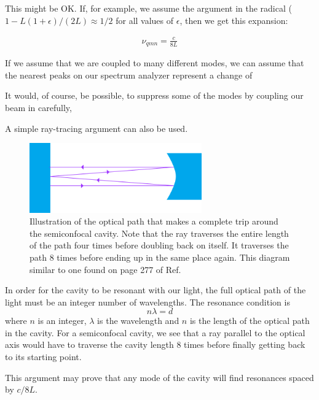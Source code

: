 This might be OK. If, for example, we assume the argument in the radical ($1-L(1+\epsilon)/(2L)\approx 1/2$ for all values of $\epsilon$, then we get this expansion: 

\begin{align}
\nu_{qmn}=\frac{c}{8L}
\end{align}



If we assume that we are coupled to many different modes, we can assume that the nearest peaks on our spectrum analyzer represent a change of 

It would, of course, be possible, to suppress some of the modes by coupling our beam in carefully, 

A simple ray-tracing argument can also be used. 
\begin{figure}
\centerline{\includegraphics[height=3cm]{spectrum_analyzer_path.png}}
\caption{Illustration of the optical path that makes a complete trip around the semiconfocal cavity. Note that the ray traverses the entire length of the path four times before doubling back on itself. It traverses the path 8 times before ending up in the same place again. This diagram similar to one found on page 277 of Ref.\ \cite{lasersMilonniEberly}}
\end{figure}

In order for the cavity to be resonant with our light, the full optical path of the light must be an integer number of wavelengths. The resonance condition is 
\begin{equation}
n \lambda = d
\end{equation}
where $n$ is an integer, $\lambda$ is the wavelength and $n$ is the length of the optical path in the cavity. 
For a semiconfocal cavity, we see that a ray parallel to the optical axis would have to traverse the cavity length 8 times before finally getting back to its starting point. 

This argument may prove that any mode of the cavity will find resonances spaced by $c/8L$.




